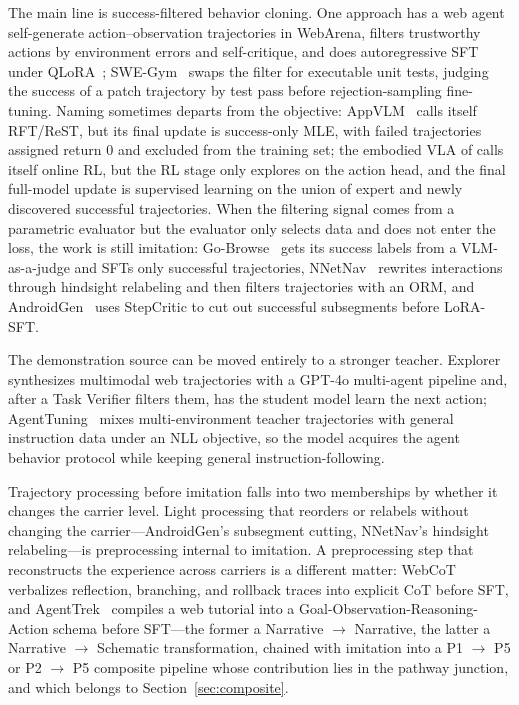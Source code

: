 The main line is success-filtered behavior cloning. One approach has a web agent self-generate action--observation trajectories in WebArena, filters trustworthy actions by environment errors and self-critique, and does autoregressive SFT under QLoRA~\cite{Pat24}; SWE-Gym~\cite{Pan24} swaps the filter for executable unit tests, judging the success of a patch trajectory by test pass before rejection-sampling fine-tuning. Naming sometimes departs from the objective: AppVLM~\cite{Pap25b} calls itself RFT/ReST, but its final update is success-only MLE, with failed trajectories assigned return $0$ and excluded from the training set; the embodied VLA of \cite{Guo25d} calls itself online RL, but the RL stage only explores on the action head, and the final full-model update is supervised learning on the union of expert and newly discovered successful trajectories. When the filtering signal comes from a parametric evaluator but the evaluator only selects data and does not enter the loss, the work is still imitation: Go-Browse~\cite{Gan25b} gets its success labels from a VLM-as-a-judge and SFTs only successful trajectories, NNetNav~\cite{Mur24b} rewrites interactions through hindsight relabeling and then filters trajectories with an ORM, and AndroidGen~\cite{Lai25d} uses StepCritic to cut out successful subsegments before LoRA-SFT.

The demonstration source can be moved entirely to a stronger teacher. Explorer~\cite{Pah25} synthesizes multimodal web trajectories with a GPT-4o multi-agent pipeline and, after a Task Verifier filters them, has the student model learn the next action; AgentTuning~\cite{Zen23d} mixes multi-environment teacher trajectories with general instruction data under an NLL objective, so the model acquires the agent behavior protocol while keeping general instruction-following.

Trajectory processing before imitation falls into two memberships by whether it changes the carrier level. Light processing that reorders or relabels without changing the carrier---AndroidGen's subsegment cutting, NNetNav's hindsight relabeling---is preprocessing internal to imitation. A preprocessing step that reconstructs the experience across carriers is a different matter: WebCoT~\cite{Hu25i} verbalizes reflection, branching, and rollback traces into explicit CoT before SFT, and AgentTrek~\cite{Xu24} compiles a web tutorial into a Goal-Observation-Reasoning-Action schema before SFT---the former a Narrative $\rightarrow$ Narrative, the latter a Narrative $\rightarrow$ Schematic transformation, chained with imitation into a P1 $\rightarrow$ P5 or P2 $\rightarrow$ P5 composite pipeline whose contribution lies in the pathway junction, and which belongs to Section~\ref{sec:composite}.

